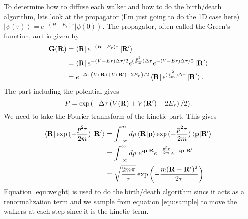 To determine how to diffuse each walker and how to do the birth/death algorithm, lets look at the propagator (I'm just going to do the 1D case here) $\left| \psi(\tau) \right> = e^{-(H-E_r)\tau} \left| \psi(0) \right>$. The propagator, often called the Green's function, and is given by
\begin{equation}
  \begin{split}
    \mathbf{G}(\mathbf{R}) &= \left<\mathbf{R}\right| e^{-(H-E_r)\tau} \left|\mathbf{R}'\right>\\
    &= \left<\mathbf{R}\right| e^{-(V-Er)\Delta\tau/2} e^{(\frac{p^2}{2m})\Delta\tau} e^{-(V-Er)\Delta\tau/2} \left|\mathbf{R}'\right>\\
    &= e^{-\Delta\tau\left(V(\mathbf{R})+V(\mathbf{R}')-2E_r\right)/2} \left<\mathbf{R}\right| e^{(\frac{p^2}{2m})\Delta\tau} \left|\mathbf{R}'\right>.
  \end{split}
\end{equation}
The part including the potential gives
\begin{equation}
  P = \exp{(-\Delta\tau\left(V(\mathbf{R})+V(\mathbf{R}')-2E_r\right)/2)}.
  \label{equ:weight}
\end{equation}
We need to take the Fourier trannsform of the kinetic part. This gives
\begin{align}
  \left< \mathbf{R} \right| \exp{(-\frac{p^2 \tau}{2m})} \left| \mathbf{R}' \right> &= \int_{-\infty}^\infty dp \left< \mathbf{R} | \mathbf{p} \right> \exp{(-\frac{p^2 \tau}{2m})} \left< \mathbf{p} | \mathbf{R}' \right> \\
  &= \int_{-\infty}^\infty dp ~ e^{i\mathbf{p} \cdot \mathbf{R}} e^{-\frac{p^2 \tau}{2m}} e^{-i \mathbf{p} \cdot \mathbf{R}'} \\
  &= \sqrt{\frac{2m\pi}{\tau}} \exp{\left( -\frac{m(\mathbf{R}- \mathbf{R}')^2}{2\tau} \right)}
  \label{equ:sample}
\end{align}
Equation \ref{equ:weight} is used to do the birth/death algorithm since it acts as a renormalization term and we sample from equation \ref{equ:sample} to move the walkers at each step since it is the kinetic term.

